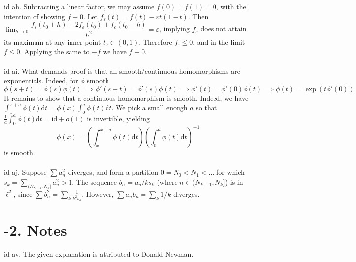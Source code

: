 \documentclass[oneside]{book}
\newcommand{\eps}{\varepsilon}
\newcommand{\fit}[1]{\left( #1\right)}
\newcommand{\inv}{^{-1}}
\renewcommand{\d}{\mathrm{d}}
\newcommand{\dt}{\mathrm{d}t}
\newcommand{\id}{\mathrm{id}}
\newcommand\chap[1]{%
  \chapter*{#1}%
  \addcontentsline{toc}{chapter}{#1}}
\begin{document}
id ah. Subtracting a linear factor, we may assume $f(0)=f(1)=0$, with the intention of showing $f\equiv 0$. Let $f_\eps(t)=f(t)-\eps t(1-t)$. Then $\displaystyle\lim_{h\to 0}\dfrac{f_\eps(t_0+h)-2f_\eps(t_0)+f_\eps(t_0-h)}{h^2}=\eps$, implying $f_\eps$ does not attain its maximum at any inner point $t_0\in(0,1)$. Therefore $f_\eps\le 0$, and in the limit $f\le 0$. Applying the same to $-f$ we have $f\equiv 0$.   \\\\


id ai. What demands proof is that all smooth/continuous homomorphisms are exponentials. Indeed, for $\phi$ smooth $$\phi(s+t)=\phi(s)\phi(t)\implies \phi'(s+t)=\phi'(s)\phi(t)\implies \phi'(t)=\phi'(0)\phi(t)\implies\phi(t)=\exp(t\phi'(0))$$
It remains to show that a continuous homomorphism is smooth. Indeed, we have $\int_x^{x+a}\phi(t)\d t=\phi(x)\int_0^a\phi(t)\d t$. We pick a small enough $a$ so that $\frac{1}{a}\int_0^a\phi(t)\d t=\id + o(1)$ is invertible, yielding
$$\phi(x)=\fit{\int_x^{x+a}\phi(t)\dt}\fit{\int_0^a\phi(t)\dt}\inv$$
is smooth.  \\\\


id aj. Suppose $\sum a_n^2$ diverges, and form a partition $0=N_0<N_1<\dots$ for which $s_k=\sum_{(N_{k-1},N_k]}a_n^2 > 1$. The sequence $b_n=a_n/ks_k$ (where $n\in (N_{k-1},N_k]$) is in $\ell^2$, since $\sum b_n^2=\sum_k \frac{1}{k^2s_k}$. However, $\sum a_nb_n=\sum_k 1/k$ diverges.


\newpage
\chap{-2. Notes}
id av. The given explanation is attributed to Donald Newman.
\end{document}
